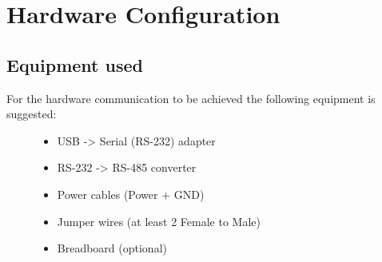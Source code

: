 \documentclass[letterpaper,10pt,english]{sphinxmanual}
\begin{document}
\section{Hardware Configuration}
\label{hardware:hardware-configuration}\label{hardware::doc}

\subsection{Equipment used}
\label{hardware:equipment-used}\begin{description}
\item[{For the hardware communication to be achieved the following equipment is suggested:}] \leavevmode\begin{itemize}
\item {} 
USB    -\textgreater{}  Serial (RS-232) adapter

\item {} 
RS-232 -\textgreater{}  RS-485 converter

\item {} 
Power cables (Power + GND)

\item {} 
Jumper wires (at least 2 Female to Male)

\item {} 
Breadboard (optional)

\end{itemize}

\end{description}
\end{document}
